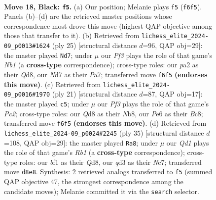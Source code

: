 \documentclass[11pt]{article}
\begin{document}
\clearpage

\begin{figure}[p]\centering
\begin{subfigure}{0.46\textwidth}\centering
\resizebox{\linewidth}{!}{%
\newchessgame
\chessboard[
  setfen={r1bq1rk1/1p1n3p/n1p1pp2/p2p4/3P1P2/2NQ1N2/PPP2KPP/2R2B1R b - - 1 18},
  showmover=false,
  pgfstyle=straightmove, color=movearrow, markmove={f6-f5}
]}
\caption{}
\end{subfigure}\hfill
\begin{subfigure}{0.46\textwidth}\centering
\resizebox{\linewidth}{!}{%
\newchessgame
\chessboard[
  setfen={rn1q1rk1/pp2bppp/2p1n3/3pN3/3P4/2PQ4/PP3PPP/RNB1R1K1 b - - 1 13},
  showmover=false,
  pgfstyle=straightmove, color=movearrow, markmove={b8-d7}
]}
\caption{}
\end{subfigure}
\\[4pt]
\begin{subfigure}{0.46\textwidth}\centering
\resizebox{\linewidth}{!}{%
\newchessgame
\chessboard[
  setfen={rnbq1rk1/ppp4p/4p1p1/3pPn2/8/2N2N1Q/PPP2PPP/R3KB1R b KQ - 0 11},
  showmover=false,
  pgfstyle=straightmove, color=movearrow, markmove={c7-c5}
]}
\caption{}
\end{subfigure}\hfill
\begin{subfigure}{0.46\textwidth}\centering
\resizebox{\linewidth}{!}{%
\newchessgame
\chessboard[
  setfen={1r1q1rk1/2n1p1bp/3p1np1/2pP4/1p3N1P/6P1/1PP1NP2/R1BQR1K1 b - - 1 18},
  showmover=false,
  pgfstyle=straightmove, color=movearrow, markmove={b8-a8}
]}
\caption{}
\end{subfigure}
\caption{\textbf{Move 18, Black: \texttt{f5}.} (a) Our position; Melanie plays \texttt{f5} (\texttt{f6f5}). Panels (b)--(d) are the retrieved master positions whose correspondence most drove this move (highest QAP objective among those that transfer to it). (b) Retrieved from \texttt{lichess\_elite\_2024-09\_p0013\#1624} (ply 25) [structural distance $d$=96, QAP obj=29]: the master played \texttt{Nd7}; under $\mu$ our \emph{Pf3} plays the role of that game's \emph{Nb1} (a \textbf{cross-type} correspondence); cross-type roles: our \emph{p}a2 as their \emph{Q}d8, our \emph{N}d7 as their \emph{P}a7; transferred move \texttt{f6f5} \textbf{(endorses this move)}. (c) Retrieved from \texttt{lichess\_elite\_2024-09\_p0016\#1970} (ply 21) [structural distance $d$=87, QAP obj=17]: the master played \texttt{c5}; under $\mu$ our \emph{Pf3} plays the role of that game's \emph{Pc2}; cross-type roles: our \emph{Q}d8 as their \emph{N}b8, our \emph{P}e6 as their \emph{B}c8; transferred move \texttt{f6f5} \textbf{(endorses this move)}. (d) Retrieved from \texttt{lichess\_elite\_2024-09\_p0024\#2245} (ply 35) [structural distance $d$=108, QAP obj=29]: the master played \texttt{Ra8}; under $\mu$ our \emph{Qd1} plays the role of that game's \emph{Rb1} (a \textbf{cross-type} correspondence); cross-type roles: our \emph{b}f1 as their \emph{Q}d8, our \emph{q}d3 as their \emph{N}c7; transferred move \texttt{d8e8}. Synthesis: 2 retrieved analogs transferred to \texttt{f5} (summed QAP objective 47, the strongest correspondence among the candidate moves); Melanie committed it via the \texttt{search} selector.}
\label{fig:thought-m35}
\end{figure}
\end{document}
